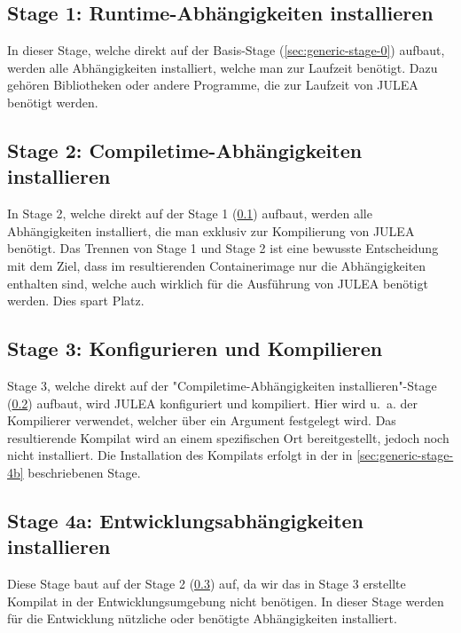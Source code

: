 \subsection{Stage 1: Runtime-Abhängigkeiten installieren} \label{sec:generic-stage-1}

In dieser Stage, welche direkt auf der Basis-Stage (\cref{sec:generic-stage-0}) aufbaut, werden alle Abhängigkeiten installiert, welche man zur Laufzeit benötigt. Dazu gehören Bibliotheken oder andere Programme, die zur Laufzeit von JULEA benötigt werden.

\subsection{Stage 2: Compiletime-Abhängigkeiten installieren} \label{sec:generic-stage-2}

In Stage 2, welche direkt auf der Stage 1 (\cref{sec:generic-stage-1}) aufbaut, werden alle Abhängigkeiten installiert, die man exklusiv zur Kompilierung von JULEA benötigt. Das Trennen von Stage 1 und Stage 2 ist eine bewusste Entscheidung mit dem Ziel, dass im resultierenden Containerimage nur die Abhängigkeiten enthalten sind, welche auch wirklich für die Ausführung von JULEA benötigt werden. Dies spart Platz.

\subsection{Stage 3: Konfigurieren und Kompilieren} \label{sec:generic-stage-3}

Stage 3, welche direkt auf der "Compiletime-Abhängigkeiten installieren"-Stage (\cref{sec:generic-stage-2}) aufbaut, wird JULEA konfiguriert und kompiliert. Hier wird u. a. der Kompilierer verwendet, welcher über ein Argument festgelegt wird. Das resultierende Kompilat wird an einem spezifischen Ort bereitgestellt, jedoch noch nicht installiert. Die Installation des Kompilats erfolgt in der in \cref{sec:generic-stage-4b} beschriebenen Stage.

\subsection{Stage 4a: Entwicklungsabhängigkeiten installieren} \label{sec:generic-stage-4a}

Diese Stage baut auf der Stage 2 (\cref{sec:generic-stage-3}) auf, da wir das in Stage 3 erstellte Kompilat in der Entwicklungsumgebung nicht benötigen. 
In dieser Stage werden für die Entwicklung nützliche oder benötigte Abhängigkeiten installiert. 

